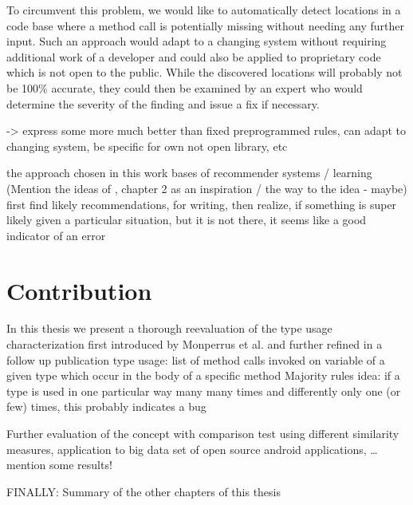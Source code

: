 To circumvent this problem, we would like to automatically detect locations in a code base where a method call is potentially missing without needing any further input.
Such an approach would adapt to a changing system without requiring additional work of a developer and could also be applied to proprietary code which is not open to the public.
While the discovered locations will probably not be 100\% accurate, they could then be examined by an expert who would determine the severity of the finding and issue a fix if necessary.

-> express some more much better than fixed preprogrammed rules, can adapt to changing system, be specific for own not open library, etc

the approach chosen in this work bases of recommender systems / learning
(Mention the ideas of \cite{bruch2012ide}, chapter 2 as an inspiration / the way to the idea - maybe)
first find likely recommendations, for writing, then realize, if something is super likely given a particular situation, but it is not there, it seems like a good indicator of an error

\section{Contribution}

In this thesis we present a thorough reevaluation of the type usage characterization first introduced by Monperrus et al.\cite{monperrus2010detecting} and further refined in a follow up publication \cite{monperrus2013detecting}
type usage: list of method calls invoked on variable of a given type which occur in the body of a specific method
Majority rules idea: if a type is used in one particular way many many times and differently only one (or few) times, this probably indicates a bug

Further evaluation of the concept with comparison test using different similarity measures, application to big data set of open source android applications, \ldots
mention some results!

FINALLY: Summary of the other chapters of this thesis
